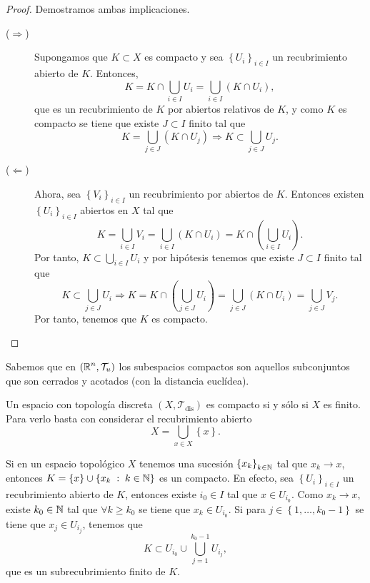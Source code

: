 \begin{proof}
Demostramos ambas implicaciones.
\begin{description}
	\item[($\displaystyle \Rightarrow $)] Supongamos que $\displaystyle K \subset X $ es compacto y sea $\displaystyle \left\{ U_{i}\right\} _{i \in I} $ un recubrimiento abierto de $\displaystyle K $. Entonces, 
		\[K = K \cap \bigcup_{i \in I}U_{i} = \bigcup_{i \in I}\left(K \cap U_{i}\right) ,\]
		que es un recubrimiento de $\displaystyle K $ por abiertos relativos de $\displaystyle K $, y como $\displaystyle K $ es compacto se tiene que existe $\displaystyle J \subset I $ finito tal que 
		\[K = \bigcup_{j \in J}\left(K \cap U_{j}\right) \Rightarrow K \subset \bigcup_{j \in J}U_{j} .\]
	\item[($\displaystyle \Leftarrow $)] Ahora, sea $\displaystyle \left\{ V_{i}\right\} _{i \in I} $ un recubrimiento por abiertos de $\displaystyle K $. Entonces existen $\displaystyle \left\{ U_{i}\right\} _{i \in I} $ abiertos en $\displaystyle X $ tal que 
		\[K= \bigcup_{i \in I}V_{i}= \bigcup_{i \in I}\left(K \cap U_{i}\right)= K \cap \left(\bigcup_{i \in I}U_{i}\right) .\]
		Por tanto, $\displaystyle K \subset \bigcup_{i \in I}U_{i} $ y por hipótesis tenemos que existe $\displaystyle J \subset I $ finito tal que 
		\[K \subset \bigcup_{j \in J}U_{i} \Rightarrow K = K \cap \left(\bigcup_{j \in J}U_{i}\right)=\bigcup_{j \in J}\left(K \cap U_{i}\right)=\bigcup_{j \in J}V_{j} .\]
		Por tanto, tenemos que $\displaystyle K $ es compacto.
\end{description}
\end{proof}
\begin{eg}
Sabemos que en $\displaystyle \left(\mathbb{R}^{n}, \mathcal{T}_{u}\right) $ los subespacios compactos son aquellos subconjuntos que son cerrados y acotados (con la distancia euclídea).
\end{eg}
\begin{eg}
Un espacio con topología discreta $\displaystyle \left(X, \mathcal{T}_{\text{dis}}\right) $ es compacto si y sólo si $\displaystyle X $ es finito. Para verlo basta con considerar el recubrimiento abierto 
\[X = \bigcup_{x \in X} \left\{ x\right\}  .\]
\end{eg}
\begin{eg}
	Si en un espacio topológico $\displaystyle X $ tenemos una sucesión $\displaystyle \left\{ x_{k}\right\} _{k \in \mathbb{N}} $ tal que $\displaystyle x_{k}\to x $, entonces $\displaystyle K = \left\{ x\right\} \cup \left\{ x_{k} \; : \; k \in \mathbb{N}\right\} $ es un compacto. En efecto, sea $\displaystyle \left\{ U_{i}\right\} _{ i \in I} $ un recubrimiento abierto de $\displaystyle K $, entonces existe $\displaystyle i_{0}\in I $ tal que $\displaystyle x \in U_{i_{0}} $. 
	Como $\displaystyle x_{k}\to x $, existe $\displaystyle k_{0}\in \mathbb{N} $ tal que $\displaystyle \forall k \geq k_{0} $ se tiene que $\displaystyle x_{k}\in U_{i_{0}} $. Si para $\displaystyle j \in \left\{ 1, \ldots, k_{0}-1\right\}  $ se tiene que $\displaystyle x_{j}\in U_{i_{j}} $, tenemos que 
	\[K \subset U_{i_{0}}\cup \bigcup_{j = 1}^{k_{0}-1}U_{i_{j}} ,\]
	que es un subrecubrimiento finito de $\displaystyle K $. 
\end{eg}
